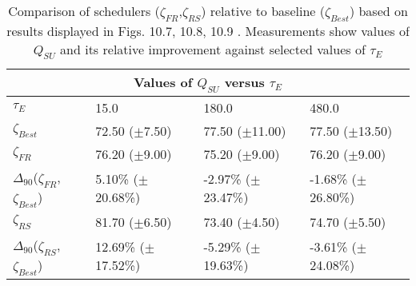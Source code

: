 \clearpage
\begin{landscape}
\begin{table}[h]
\begin{center}
\begin{tabular}{llll}
\toprule
\multicolumn{4}{c}{Values of $Q_{SU}$ versus $\tau_E$}\\
\midrule
$\tau_E$ & 15.0 & 180.0 & 480.0\\
\midrule
$\zeta_{Best}$ &  72.50 ($\pm$7.50) &  77.50 ($\pm$11.00) &  77.50 ($\pm$13.50)\\
\midrule
$\zeta_{FR}$ &  76.20 ($\pm$9.00) &  75.20 ($\pm$9.00) &  76.20 ($\pm$9.00)\\
$\Delta_{90}$($\zeta_{FR}$,$\zeta_{Best}$) & 5.10\% ($\pm$20.68\%) & -2.97\% ($\pm$23.47\%) & -1.68\% ($\pm$26.80\%)\\
$\zeta_{RS}$ &  81.70 ($\pm$6.50) &  73.40 ($\pm$4.50) &  74.70 ($\pm$5.50)\\
$\Delta_{90}$($\zeta_{RS}$,$\zeta_{Best}$) & 12.69\% ($\pm$17.52\%) & -5.29\% ($\pm$19.63\%) & -3.61\% ($\pm$24.08\%)\\
\bottomrule
\end{tabular}
\end{center}
\caption[Comparison of $Q_{SU}$ versus $\tau_E$ for $\zeta_{FR}$,$\zeta_{RS}$ relative to $\zeta_{Best}$.]{Comparison of schedulers ($\zeta_{FR}$,$\zeta_{RS}$) relative to baseline ($\zeta_{Best}$) based on results displayed in Figs. 10.7, 10.8, 10.9 . Measurements show values of $Q_{SU}$ and its relative improvement against selected values of $\tau_E$}
\label{b:f107}
\end{table}
\end{landscape}


